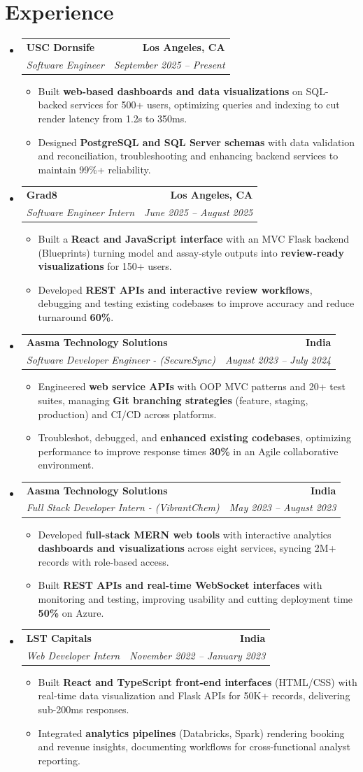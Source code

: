 \documentclass[letterpaper,10pt]{article}
\makeatletter
\newcommand{\resumeItem}[1]{\item\small{{#1 \vspace{-2pt}}}}
\newcommand{\resumeSubheading}[4]{\vspace{-1pt}\item\begin{tabular*}{1.0\textwidth}[t]{l@{\extracolsep{\fill}}r}\textbf{#1} & \textbf{\small #2} \\\textit{\small#3} & \textit{\small #4} \\\end{tabular*}\vspace{-2pt}}
\newcommand{\resumeSubHeadingListStart}{\begin{itemize}[leftmargin=0.0in, label={}]}
\newcommand{\resumeSubHeadingListEnd}{\end{itemize}}
\newcommand{\resumeItemListStart}{\begin{itemize}[leftmargin=0.15in,label=\textbullet,itemsep=2pt,topsep=0pt,parsep=0pt,partopsep=0pt]}
\newcommand{\resumeItemListEnd}{\end{itemize}\vspace{-4pt}}
\makeatother
\begin{document}
\section{Experience}
\resumeSubHeadingListStart
\resumeSubheading{USC Dornsife}{Los Angeles, CA}{Software Engineer}{September 2025 -- Present}
\resumeItemListStart
\resumeItem{Built \textbf{web-based dashboards and data visualizations} on SQL-backed services for 500+ users, optimizing queries and indexing to cut render latency from 1.2s to 350ms.}
\resumeItem{Designed \textbf{PostgreSQL and SQL Server schemas} with data validation and reconciliation, troubleshooting and enhancing backend services to maintain 99\%+ reliability.}
\resumeItemListEnd
\resumeSubheading{Grad8}{Los Angeles, CA}{Software Engineer Intern}{June 2025 -- August 2025}
\resumeItemListStart
\resumeItem{Built a \textbf{React and JavaScript interface} with an MVC Flask backend (Blueprints) turning model and assay-style outputs into \textbf{review-ready visualizations} for 150+ users.}
\resumeItem{Developed \textbf{REST APIs and interactive review workflows}, debugging and testing existing codebases to improve accuracy and reduce turnaround \textbf{60\%}.}
\resumeItemListEnd
\resumeSubheading{Aasma Technology Solutions}{India}{Software Developer Engineer - (SecureSync)}{August 2023 -- July 2024}
\resumeItemListStart
\resumeItem{Engineered \textbf{web service APIs} with OOP MVC patterns and 20+ test suites, managing \textbf{Git branching strategies} (feature, staging, production) and CI/CD across platforms.}
\resumeItem{Troubleshot, debugged, and \textbf{enhanced existing codebases}, optimizing performance to improve response times \textbf{30\%} in an Agile collaborative environment.}
\resumeItemListEnd
\resumeSubheading{Aasma Technology Solutions}{India}{Full Stack Developer Intern - (VibrantChem)}{May 2023 -- August 2023}
\resumeItemListStart
\resumeItem{Developed \textbf{full-stack MERN web tools} with interactive analytics \textbf{dashboards and visualizations} across eight services, syncing 2M+ records with role-based access.}
\resumeItem{Built \textbf{REST APIs and real-time WebSocket interfaces} with monitoring and testing, improving usability and cutting deployment time \textbf{50\%} on Azure.}
\resumeItemListEnd
\resumeSubheading{LST Capitals}{India}{Web Developer Intern}{November 2022 -- January 2023}
\resumeItemListStart
\resumeItem{Built \textbf{React and TypeScript front-end interfaces} (HTML/CSS) with real-time data visualization and Flask APIs for 50K+ records, delivering sub-200ms responses.}
\resumeItem{Integrated \textbf{analytics pipelines} (Databricks, Spark) rendering booking and revenue insights, documenting workflows for cross-functional analyst reporting.}
\resumeItemListEnd
\resumeSubHeadingListEnd
\vspace{-6pt}
\end{document}
